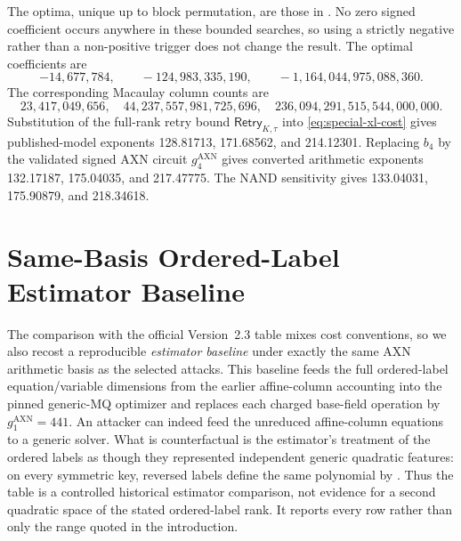 \documentclass[11pt]{article}
\begin{document}
The optima, unique up
to block permutation, are
those in .  No zero signed coefficient occurs anywhere
in these bounded searches, so using a strictly negative rather than a
non-positive trigger does not change the result.  The optimal coefficients are
\[
 -14{,}677{,}784,\qquad
 -124{,}983{,}335{,}190,\qquad
 -1{,}164{,}044{,}975{,}088{,}360.
\]
The corresponding Macaulay column counts are
\[
 23{,}417{,}049{,}656,
 \quad 44{,}237{,}557{,}981{,}725{,}696,
 \quad 236{,}094{,}291{,}515{,}544{,}000{,}000.
\]
Substitution of the full-rank retry bound
$\mathsf{Retry}_{K,\tau}$ into \eqref{eq:special-xl-cost} gives published-model exponents
128.81713, 171.68562, and 214.12301.  Replacing $b_4$ by the validated signed AXN circuit
$g_4^{\mathrm{AXN}}$ gives converted arithmetic exponents 132.17187,
175.04035, and 217.47775.  The NAND sensitivity gives 133.04031, 175.90879,
and 218.34618.

\section{Same-Basis Ordered-Label Estimator Baseline}\label{app:ordered-baseline}

The comparison with the official Version~2.3 table mixes cost conventions, so
we also recost a reproducible \emph{estimator baseline} under exactly the same
AXN arithmetic basis as the selected attacks.  This baseline feeds the full
ordered-label equation/variable dimensions from the earlier affine-column
accounting into the pinned generic-MQ optimizer and replaces each charged
base-field operation by $g_1^{\mathrm{AXN}}=441$.  An attacker can indeed feed
the unreduced affine-column equations to a generic solver.  What is
counterfactual is the estimator's treatment of the ordered labels as though
they represented independent generic quadratic features: on every symmetric
key, reversed labels define the same polynomial by
.  Thus the table is a controlled historical
estimator comparison, not evidence for a second quadratic space of the stated
ordered-label rank.  It reports every row rather than only the range quoted in
the introduction.
\end{document}
